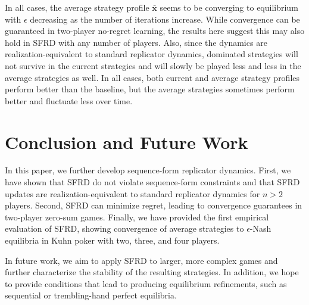 \documentclass{aamas2014}
\newcommand{\bx}{\mathbf{x}}
\begin{document}
In all cases, the average strategy profile $\bar{\bx}$ seems to be converging to equilibrium with $\epsilon$ decreasing as the
number of iterations increase. 
While convergence can be guaranteed in two-player no-regret learning, the results here suggest this may also hold in SFRD with 
any number of players.  
Also, since the dynamics are realization-equivalent to standard replicator dynamics, dominated strategies will not survive 
in the current strategies and will slowly be played less and less in the average strategies as well. 
In all cases, both current and average strategy profiles perform better than the baseline, but the average strategies sometimes perform 
better and fluctuate less over time. 

\section{Conclusion and Future Work}

In this paper, we further develop sequence-form replicator dynamics. 
First, we have shown that SFRD do not violate sequence-form constraints and
that SFRD updates are realization-equivalent to standard replicator dynamics
for $n > 2$ players. Second, SFRD can minimize regret, leading to 
convergence guarantees in two-player zero-sum games. Finally, we have provided
the first empirical evaluation of SFRD, showing convergence of average strategies 
to $\epsilon$-Nash equilibria in Kuhn poker with two, three, and four players.  

In future work, we aim to apply SFRD to larger, more complex games and further characterize the stability of the resulting strategies. 
In addition, we hope to provide conditions that lead to producing equilibrium refinements, 
such as sequential or trembling-hand perfect equilibria. 


%

%
%
\end{document}
